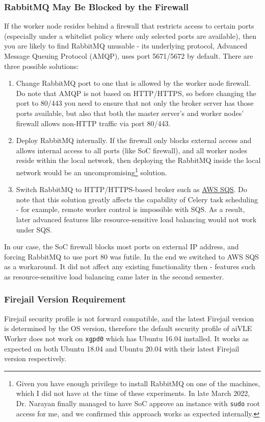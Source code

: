 \subsubsection{RabbitMQ May Be Blocked by the Firewall}
If the worker node resides behind a firewall that restricts access to certain ports (especially under a whitelist policy where only selected ports are available), then you are likely to find RabbitMQ unusable - its underlying protocol, Advanced Message Queuing Protocol (AMQP), uses port 5671/5672 by default. There are three possible solutions:
\begin{enumerate}
    \item Change RabbitMQ port to one that is allowed by the worker node firewall. Do note that AMQP is not based on HTTP/HTTPS, so before changing the port to 80/443 you need to ensure that not only the broker server has those ports available, but also that both the master server's and worker nodes' firewall allows non-HTTP traffic via port 80/443.
    \item Deploy RabbitMQ internally. If the firewall only blocks external access and allows internal access to all ports (like SoC firewall), and all worker nodes reside within the local network, then deploying the RabbitMQ inside the local network would be an uncompromising\footnote{Given you have enough privilege to install RabbitMQ on one of the machines, which I did not have at the time of these experiments. In late March 2022, Dr. Narayan finally managed to have SoC approve an instance with \texttt{sudo} root access for me, and we confirmed this approach works as expected internally.} solution.
    \item Switch RabbitMQ to HTTP/HTTPS-based broker such as \href{https://aws.amazon.com/sqs/}{AWS SQS}. Do note that this solution greatly affects the capability of Celery task scheduling - for example, remote worker control is impossible with SQS. As a result, later advanced features like resource-sensitive load balancing would not work under SQS.
\end{enumerate}
In our case, the SoC firewall blocks most ports on external IP address, and forcing RabbitMQ to use port 80 was futile. In the end we switched to AWS SQS as a workaround. It did not affect any existing functionality then - features such as resource-sensitive load balancing came later in the second semester.

\subsubsection{Firejail Version Requirement}
Firejail security profile is not forward compatible, and the latest Firejail version is determined by the OS version, therefore the default security profile of aiVLE Worker does not work on  \texttt{xgpd0} which has Ubuntu 16.04 installed. It works as expected on both Ubuntu 18.04 and Ubuntu 20.04 with their latest Firejail version respectively.

